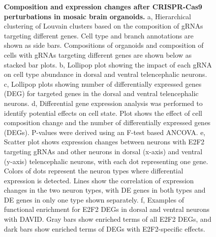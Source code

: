 \begin{figure}[h!]
    \centering
    \caption{\textbf{Composition and expression changes after CRISPR-Cas9 perturbations in mosaic brain organoids.} a, Hierarchical clustering of Louvain clusters based on the composition of gRNAs targeting different genes. Cell type and branch annotations are shown as side bars. Compositions of organoids and composition of cells with gRNAs targeting different genes are shown below as stacked bar plots. b, Lollipop plot showing the impact of each gRNA on cell type abundance in dorsal and ventral telencephalic neurons. c, Lollipop plots showing number of differentially expressed genes (DEG) for targeted genes in the dorsal and ventral telencephalic neurons. d, Differential gene expression analysis was performed to identify potential effects on cell state. Plot shows the effect of cell composition change and the number of differentially expressed genes (DEGs). P-values were derived using an F-test based ANCOVA.  e, Scatter plot shows expression changes between neurons with E2F2 targeting gRNAs and other neurons in dorsal (x-axis) and ventral (y-axis) telencephalic neurons, with each dot representing one gene. Colors of dots represent the neuron types where differential expression is detected. Lines show the correlation of expression changes in the two neuron types, with DE genes in both types and DE genes in only one type shown separately. f, Examples of functional enrichment for E2F2 DEGs in dorsal and ventral neurons with DAVID. Gray bars show enriched terms of all E2F2 DEGs, and dark bars show enriched terms of DEGs with E2F2-specific effects.}
\end{figure}

\clearpage


